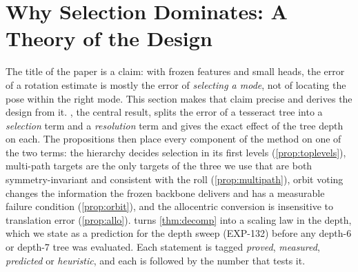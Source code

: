 \makeatletter
{}
\makeatother

\section{Why Selection Dominates: A Theory of the Design}
\label{sec:supp_theory}

The title of the paper is a claim: with frozen features and small heads, the error of a rotation estimate is mostly the error
of \emph{selecting a mode}, not of locating the pose within the right mode. This section makes that claim precise and derives
the design from it. , the central result, splits the error of a tesseract tree into a \emph{selection}
term and a \emph{resolution} term and gives the exact effect of the tree depth on each. The propositions then place every
component of the method on one of the two terms: the hierarchy decides selection in its first levels
(\cref{prop:toplevels}), multi-path targets are the only targets of the three we use that are both symmetry-invariant and
consistent with the roll (\cref{prop:multipath}), orbit voting changes the information the frozen backbone delivers and has
a measurable failure condition (\cref{prop:orbit}), and the allocentric conversion is insensitive to translation error
(\cref{prop:allo}).  turns \cref{thm:decomp} into a scaling law in the depth, which we state as a
prediction for the depth sweep (EXP-132) before any depth-6 or depth-7 tree was evaluated. Each statement is tagged
\emph{proved}, \emph{measured}, \emph{predicted} or \emph{heuristic}, and each is followed by the number that tests it.

